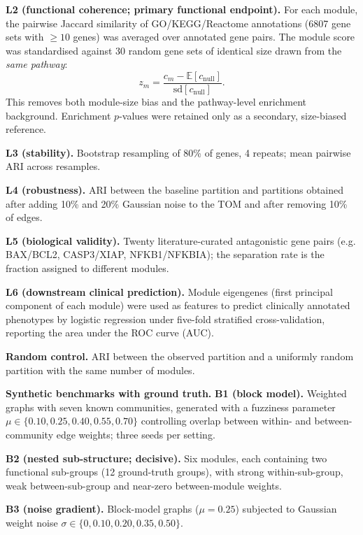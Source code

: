 \documentclass[twocolumn,10pt,letterpaper]{article}
\begin{document}
\noindent\textbf{L2 (functional coherence; primary functional endpoint).} For each module,
the pairwise Jaccard similarity of GO/KEGG/Reactome annotations
\citep{ashburner2000go,jassal2020reactome}
(6807 gene sets with $\geq 10$ genes) was averaged over annotated gene pairs. The module score was standardised
against 30 random gene sets of identical size drawn from the \emph{same pathway}:
\begin{equation}
z_m = \frac{c_m - \mathbb{E}[c_{\mathrm{null}}]}{\mathrm{sd}[c_{\mathrm{null}}]}.
\end{equation}
This removes both module-size bias and the pathway-level enrichment background. Enrichment
$p$-values were retained only as a secondary, size-biased reference.

\noindent\textbf{L3 (stability).} Bootstrap resampling of 80\% of genes, 4 repeats; mean
pairwise ARI across resamples.

\noindent\textbf{L4 (robustness).} ARI between the baseline partition and partitions
obtained after adding 10\% and 20\% Gaussian noise to the TOM and after removing 10\% of
edges.

\noindent\textbf{L5 (biological validity).} Twenty literature-curated antagonistic gene
pairs (e.g. BAX/BCL2, CASP3/XIAP, NFKB1/NFKBIA); the separation rate is the fraction
assigned to different modules.

\noindent\textbf{L6 (downstream clinical prediction).} Module eigengenes (first principal
component of each module) were used as features to predict clinically annotated phenotypes
by logistic regression under five-fold stratified cross-validation, reporting the area
under the ROC curve (AUC).

\noindent\textbf{Random control.} ARI between the observed partition and a uniformly random
partition with the same number of modules.

\noindent\textbf{Synthetic benchmarks with ground truth.} \noindent\textbf{B1 (block model).} Weighted graphs with seven known communities, generated
with a fuzziness parameter $\mu\in\{0.10,0.25,0.40,0.55,0.70\}$ controlling overlap between
within- and between-community edge weights; three seeds per setting.

\noindent\textbf{B2 (nested sub-structure; decisive).} Six modules, each containing two
functional sub-groups (12 ground-truth groups), with strong within-sub-group, weak
between-sub-group and near-zero between-module weights.

\noindent\textbf{B3 (noise gradient).} Block-model graphs ($\mu=0.25$) subjected to
Gaussian weight noise $\sigma\in\{0,0.10,0.20,0.35,0.50\}$.
\end{document}
